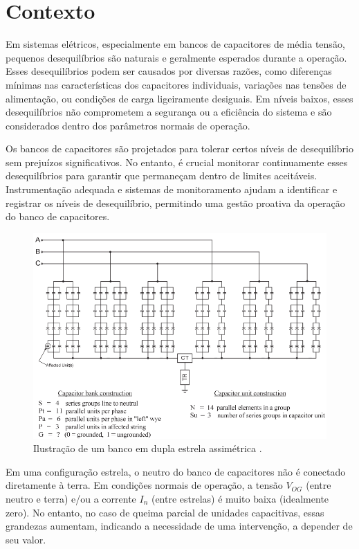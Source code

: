 \documentclass[a4paper]{article}
\begin{document}

\section{Contexto}
Em sistemas elétricos, especialmente em bancos de capacitores de média tensão, pequenos desequilíbrios são naturais e geralmente esperados durante a operação. Esses desequilíbrios podem ser causados por diversas razões, como diferenças mínimas nas características dos capacitores individuais, variações nas tensões de alimentação, ou condições de carga ligeiramente desiguais. Em níveis baixos, esses desequilíbrios não comprometem a segurança ou a eficiência do sistema e são considerados dentro dos parâmetros normais de operação.

Os bancos de capacitores são projetados para tolerar certos níveis de desequilíbrio sem prejuízos significativos. No entanto, é crucial monitorar continuamente esses desequilíbrios para garantir que permaneçam dentro de limites aceitáveis. Instrumentação adequada e sistemas de monitoramento ajudam a identificar e registrar os níveis de desequilíbrio, permitindo uma gestão proativa da operação do banco de capacitores.

\begin{figure}[htbp]
	\centering
	\includegraphics[width=0.9\linewidth]{"Figure 34 Illustration of an uneven double wye connected bank"}
	\caption{Ilustração de um banco em dupla estrela assimétrica \cite{ieeec3799}.}
	\label{fig:figure-34-illustration-of-an-uneven-double-wye-connected-bank}
\end{figure}

Em uma configuração estrela, o neutro do banco de capacitores não é conectado diretamente à terra. Em condições normais de operação, a tensão $V_{OG}$ (entre neutro e terra) e/ou a corrente $I_n$ (entre estrelas) é muito baixa (idealmente zero). No entanto, no caso de queima parcial de unidades capacitivas, essas grandezas aumentam, indicando a necessidade de uma intervenção, a depender de seu valor.
\end{document}

